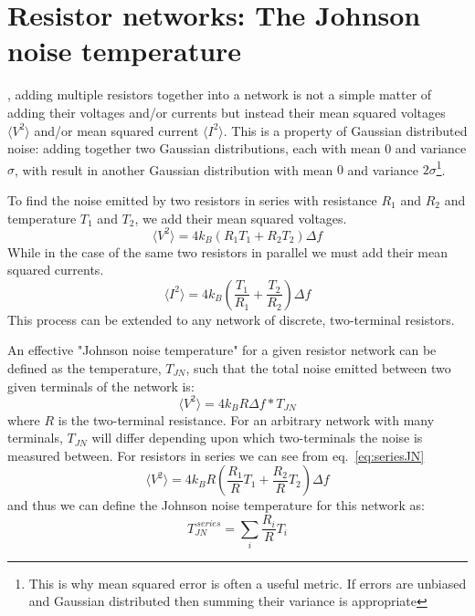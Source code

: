 \section{Resistor networks: The Johnson noise temperature}
, adding multiple resistors together into a network is not a simple matter of adding their voltages and/or currents but instead their mean squared voltages $\langle V^2\rangle$ and/or mean squared current $\langle I^2\rangle$. This is a property of Gaussian distributed noise: adding together two Gaussian distributions, each with mean $0$ and variance $\sigma$, with result in another Gaussian distribution with mean $0$ and variance $2\sigma$\footnote{This is why mean squared error is often a useful metric. If errors are unbiased and Gaussian distributed then summing their variance is appropriate}.

To find the noise emitted by two resistors in series with resistance $R_1$ and $R_2$ and temperature $T_1$ and $T_2$, we add their mean squared voltages.
\begin{equation} \label{eq:seriesJN}
\langle V^2\rangle = 4k_B (R_1T_1+R_2T_2)\Delta f
\end{equation}
While in the case of the same two resistors in parallel we must add their mean squared currents.
\begin{equation} \label{eq:parallelJN}
\langle I^2\rangle = 4k_B \left(\frac{T_1}{R_1}+\frac{T_2}{R_2}\right)\Delta f
\end{equation}
This process can be extended to any network of discrete, two-terminal resistors.

An effective "Johnson noise temperature" for a given resistor network can be defined as the temperature, $T_{JN}$, such that the total noise emitted between two given terminals of the network is:
\begin{equation}
\langle V^2\rangle = 4k_BR\Delta f * T_{JN}
\end{equation}
where $R$ is the two-terminal resistance. For an arbitrary network with many terminals, $T_{JN}$ will differ depending upon which two-terminals the noise is measured between. For resistors in series we can see from eq.~\ref{eq:seriesJN}
\begin{equation}
\langle V^2\rangle = 4k_BR \left(\frac{R_1}{R}T_1+\frac{R_2}{R}T_2\right)\Delta f
\end{equation}
and thus we can define the Johnson noise temperature for this network as:
\begin{equation}
T_{JN}^{\ series} = \sum_i \frac{R_i}{R}T_i
\end{equation}


